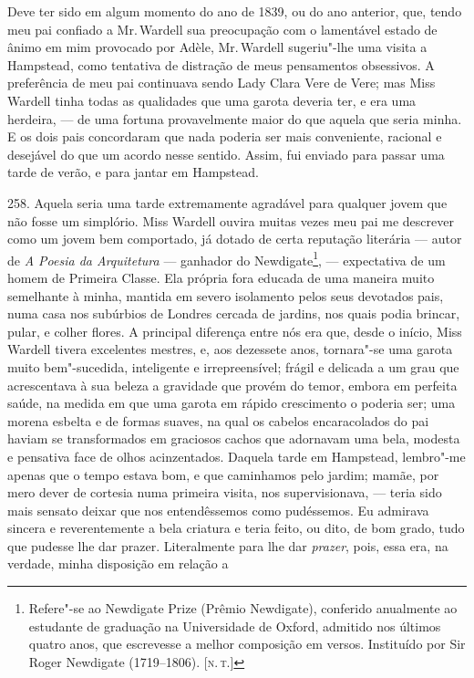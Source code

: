 Deve ter sido em algum momento do ano de 1839, ou do ano anterior, que,
tendo meu pai confiado a Mr.\,Wardell sua preocupação com o lamentável
estado de ânimo em mim provocado por Adèle, Mr.\,Wardell sugeriu"-lhe uma
visita a Hampstead, como tentativa de distração de meus pensamentos
obsessivos. A preferência de meu pai continuava sendo Lady Clara Vere de
Vere; mas Miss Wardell tinha todas as qualidades que uma garota deveria
ter, e era uma herdeira, --- de uma fortuna provavelmente maior do que
aquela que seria minha. E os dois pais concordaram que nada poderia ser
mais conveniente, racional e desejável do que um acordo nesse sentido.
Assim, fui enviado para passar uma tarde de verão, e para jantar em
Hampstead.

258. Aquela seria uma tarde extremamente agradável para qualquer jovem
que não fosse um simplório. Miss Wardell ouvira muitas vezes meu pai me
descrever como um jovem bem comportado, já dotado de certa reputação
literária --- autor de \emph{A Poesia da Arquitetura} --- ganhador do
Newdigate\footnote{Refere"-se ao Newdigate Prize (Prêmio Newdigate),
  conferido anualmente ao estudante de graduação na Universidade de
  Oxford, admitido nos últimos quatro anos, que escrevesse a melhor
  composição em versos. Instituído por Sir Roger Newdigate (1719--1806).
  {[}\textsc{n.\,t.}{]}}, --- expectativa de um homem de Primeira Classe. Ela
própria fora educada de uma maneira muito semelhante à minha, mantida em
severo isolamento pelos seus devotados pais, numa casa nos subúrbios de
Londres cercada de jardins, nos quais podia brincar, pular, e colher
flores. A principal diferença entre nós era que, desde o início, Miss
Wardell tivera excelentes mestres, e, aos dezessete anos, tornara"-se uma
garota muito bem"-sucedida, inteligente e irrepreensível; frágil e
delicada a um grau que acrescentava à sua beleza a gravidade que provém
do temor, embora em perfeita saúde, na medida em que uma garota em
rápido crescimento o poderia ser; uma morena esbelta e de formas suaves,
na qual os cabelos encaracolados do pai haviam se transformados em
graciosos cachos que adornavam uma bela, modesta e pensativa face de
olhos acinzentados. Daquela tarde em Hampstead, lembro"-me apenas que o
tempo estava bom, e que caminhamos pelo jardim; mamãe, por mero dever de
cortesia numa primeira visita, nos supervisionava, --- teria sido mais
sensato deixar que nos entendêssemos como pudéssemos. Eu admirava
sincera e reverentemente a bela criatura e teria feito, ou dito, de bom
grado, tudo que pudesse lhe dar prazer. Literalmente para lhe dar
\emph{prazer}, pois, essa era, na verdade, minha disposição em relação a
